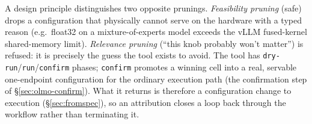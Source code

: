 A design principle distinguishes two opposite prunings. \emph{Feasibility
pruning} (safe) drops a configuration that physically cannot serve on the hardware
with a typed reason (e.g.\ float32 on a mixture-of-experts model exceeds the vLLM
fused-kernel shared-memory limit). \emph{Relevance pruning} (``this knob probably
won't matter'') is refused: it is precisely the guess the tool exists to avoid.
The tool has \texttt{dry-run}/\texttt{run}/\texttt{confirm} phases; \texttt{confirm}
promotes a winning cell into a real, servable one-endpoint configuration for the
ordinary execution path (the confirmation step of \S\ref{sec:olmo-confirm}). What
it returns is therefore a configuration change to execution (\S\ref{sec:fromspec}),
so an attribution closes a loop back through the workflow rather than terminating
it.
